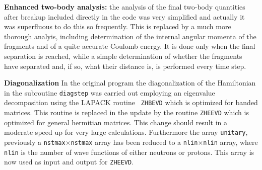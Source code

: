 \documentclass[final,1p,twocolumn]{elsarticle}
\begin{document}
\begin{small}
{\color{red}
{\bf Enhanced two-body analysis:} the analysis of the final two-body
quantities after breakup included directly in the code was very
simplified and actually it was superfluous to do this so frequently.
This is replaced by a much more thorough analyis, including
determination of the internal angular momenta of the fragments and of
a quite accurate Coulomb energy. It is done only when the final
separation is reached, while a simple determination of whether the
fragments have separated and, if so, what their distance is, is
performed every time step.
}

 {\bf Diagonalization} In the original program the diagonalization of
 the Hamiltonian in the subroutine {\tt diagstep} was carried out
 employing an eigenvalue decomposition using the LAPACK routine {\tt
   ZHBEVD} which is optimized for banded matrices. This routine is
 replaced in the update by the routine {\tt ZHEEVD} which is optimized
 for general hermitian matrices. This change should result in a
 moderate speed up for very large calculations. Furthermore the array
 {\tt unitary}, previously a {\tt nstmax}$\times${\tt nstmax} array
 has been reduced to a {\tt nlin}$\times${\tt nlin} array, where {\tt
   nlin} is the number of wave functions of either neutrons or
 protons. This array is now used as input and output for {\tt ZHEEVD}.


\end{small}
\end{document}
